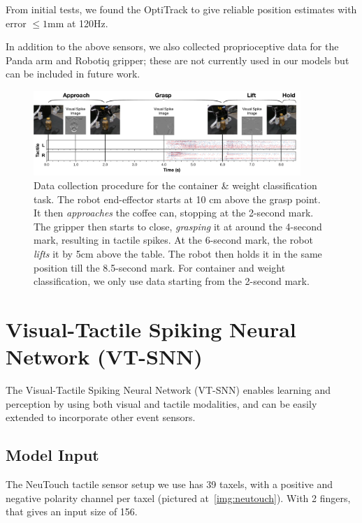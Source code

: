 \documentclass[fyp]{socreport}
\begin{document}
From initial tests, we found the OptiTrack to give reliable position estimates
with error $\leq 1$mm at 120Hz.

In addition to the above sensors, we also collected proprioceptive data for the
Panda arm and Robotiq gripper; these are not currently used in our models but
can be included in future work.

\begin{figure}
\centering
\includegraphics[width=0.90\textwidth]{images/robotsetup/RobotMotion_Exp1.pdf}
\caption{Data collection procedure for the container \& weight classification
  task. The robot end-effector starts at 10 cm above the grasp point. It then
  \emph{approaches} the coffee can, stopping at the 2-second mark. The gripper
  then starts to close, \emph{grasping} it at around the 4-second mark,
  resulting in tactile spikes. At the 6-second mark, the robot \emph{lifts} it
  by 5cm above the table. The robot then holds it in the same position till the
  8.5-second mark. For container and weight classification, we only use data
  starting from the 2-second mark.}
\label{fig:robot_motion}
\end{figure}

\chapter{Visual-Tactile Spiking Neural Network (VT-SNN)\label{cha:vtsnn}}

The Visual-Tactile Spiking Neural Network (VT-SNN) enables learning and
perception by using both visual and tactile modalities, and can be easily
extended to incorporate other event sensors.

\section{Model Input}

The NeuTouch tactile sensor setup we use has 39 taxels, with a positive and
negative polarity channel per taxel (pictured at~\autoref{img:neutouch}).
With 2 fingers, that gives an input size of 156.
\end{document}
